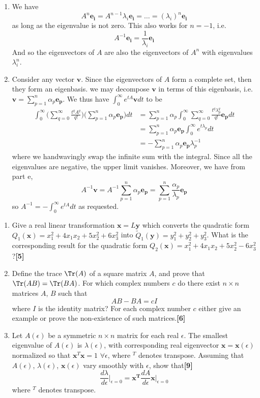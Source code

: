 \documentclass[a4paper]{article}
\begin{document}
\begin{ans}
\begin{enumerate}[label=(\alph*)]
\item We have 
$$A^n\mathbf{e_i}=A^{n-1}\lambda_i\mathbf{e_i}=\dots=(\lambda_i)^n\mathbf{e_i}$$
as long as the eigenvalue is not zero. This also works for $n=-1$, i.e.
$$A^{-1}\mathbf{e_i}=\frac{1}{\lambda_i}\mathbf{e_i}$$
And so the eigenvectors of $A$ are also the eigenvectors of $A^n$ with eigenvalues $\lambda_i^n$.
\item Consider any vector $\mathbf{v}$. Since the eigenvectors of $A$ form a complete set, then they form an eigenbasis. we may decompose $\mathbf{v}$ in terms of this eigenbasis, i.e. $\mathbf{v}=\sum_{p=1}^n\alpha_p\mathbf{e_p}$. We thus have $\int_0^\infty e^{tA}\mathbf{v}dt$ to be
\begin{align}
\int_0^\infty\bigg(\sum_{q=0}^\infty\frac{t^qA^q}{q!}\bigg)\bigg(\sum_{p=1}^n\alpha_p\mathbf{e_p}\bigg)dt&=\sum_{p=1}^n\alpha_p\int_0^\infty\sum_{q=0}^\infty\frac{t^q\lambda_p^q}{q!}\mathbf{e_p}dt\nonumber\\&=\sum_{p=1}^n\alpha_p\mathbf{e_p}\int_0^\infty e^{t\lambda_p}dt\nonumber\\&=-\sum_{p=1}^n\alpha_p\mathbf{e_p}\lambda_p^{-1}\nonumber
\end{align}
where we handwavingly swap the infinite sum with the integral. 
Since all the eigenvalues are negative, the upper limit vanishes. Moreover, we have from part e, $$A^{-1}\mathbf{v}=A^{-1}\sum_{p=1}^n\alpha_p\mathbf{e_p}=\sum_{p=1}^n\frac{\alpha_p}{\lambda_p}\mathbf{e_p}$$
so $A^{-1}=-\int_0^\infty e^{tA}dt$ as requested.
\end{enumerate}
\end{ans}
\begin{qns}\leavevmode
\begin{enumerate}[label=(\alph*)]
    \item Give a real linear transformation $\mathbf{x}=L\mathbf{y}$ which converts the quadratic form $Q_1(\mathbf{x})=x_1^2+4x_1x_2+5x_2^2+6x_3^2$ into $\tilde{Q}_1(\mathbf{y})=y_1^2+y_2^2+y_3^2$. What is the corresponding result for the quadratic form $Q_2(\mathbf{x})=x_1^2+4x_1x_2+5x_2^2-6x_3^2$?\hfill \textbf{[5]}
    \item Define the trace $\Tr(A)$ of a square matrix $A$, and prove that $\Tr(AB)=\Tr(BA)$. For which complex numbers $c$ do there exist $n\times n$ matrices $A$, $B$ such that
$$AB-BA=cI$$
where $I$ is the identity matrix? For each complex number $c$ either give an example or prove the non-existence of such matrices.\hfill \textbf{[6]}
\item Let $A(\epsilon)$ be a symmetric $n\times n$ matrix for each real $\epsilon$. The smallest eigenvalue of $A(\epsilon)$ is $\lambda(\epsilon)$, with corresponding real eigenvector $\mathbf{x}=\mathbf{x}(\epsilon)$ normalized so that $\mathbf{x}^T\mathbf{x}=1$ $\forall\epsilon$, where $^T$ denotes transpose. Assuming that $A(\epsilon)$, $\lambda(\epsilon)$, $\mathbf{x}(\epsilon)$ vary smoothly with $\epsilon$, show that\hfill \textbf{[9]}
$$\frac{d\lambda}{d\epsilon}\bigg|_{\epsilon=0}=\mathbf{x^T}\frac{dA}{d\epsilon}\mathbf{x}\bigg|_{\epsilon=0}$$
where $^T$ denotes transpose.
\end{enumerate}
\end{qns}
\end{document}
